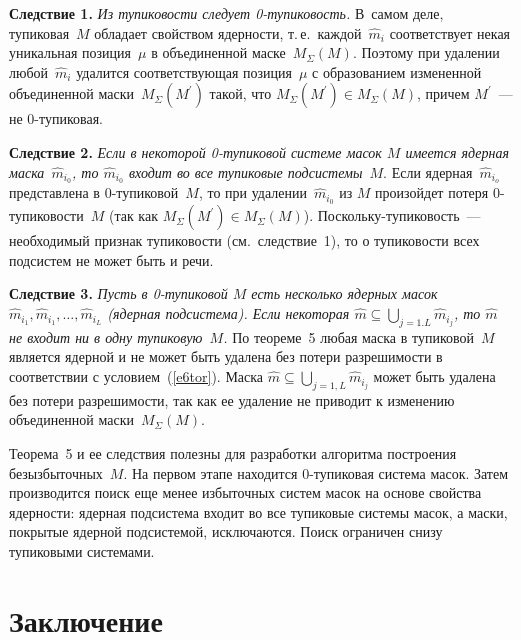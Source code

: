 \begin{multicols}{2}
\medskip

\noindent
\textbf{Следствие 1.} \textit{Из тупиковости следует 0-ту\-пи\-ковость.} 
В~самом деле, тупиковая~$M$ обладает свойством ядерности, т.\,е.\ 
каждой~$\hat{m}_i$ соответствует некая уникальная позиция~$\mu$ в 
объединенной маске~$M_\Sigma(M)$. Поэтому при удалении 
любой~$\hat{m}_i$ удалится соответствующая позиция~$\mu$ с образованием 
измененной объединенной маски~$M_\Sigma(M^\prime)$ такой, что 
$M_\Sigma(M^\prime)\in M_\Sigma(M)$, причем $M^\prime$~--- не 0-тупиковая.

\medskip

\noindent
\textbf{Следствие 2.} \textit{Если в некоторой 0-тупиковой сис\-те\-ме масок $M$ 
имеется ядерная маска~$\hat{m}_{i_0}$, то $\hat{m}_{i_0}$ входит во все 
тупиковые подсистемы}~$M$. Если ядерная~$\hat{m}_{i_o}$ представлена в 
0-тупиковой~$M$, то при удалении~$\hat{m}_{i_0}$ из $M$ произойдет потеря 
0-ту\-пи\-ко\-вости~$M$ (так как $M_\Sigma(M^\prime)\in M_\Sigma(M)$). 
Поскольку\linebreak 0-тупиковость~--- необходимый признак тупиковости (см.\ следствие~1), 
то о тупиковости всех подсистем не может быть и речи. 

\medskip

\noindent
\textbf{Следствие 3.} \textit{Пусть в 0-тупиковой $M$ есть несколько ядерных 
масок $\hat{m}_{i_1}, \hat{m}_{i_1}, \ldots , \hat{m}_{i_L}$ (ядерная 
подсистема). Если некоторая $\hat{m}\subseteq \bigcup\limits_{j=1.L} 
\hat{m}_{i_j}$, то $\hat{m}$ не входит ни в одну тупиковую~$M$.} По 
теореме~5 любая маска в тупиковой~$M$ является ядерной и не может быть 
удалена без потери разрешимости в соответствии с условием~(\ref{e6tor}). 
Маска $\hat{m}\subseteq \bigcup\limits_{j=1,L} \hat{m}_{i_j}$ может быть удалена 
без потери разрешимости, так как ее удаление не приводит к изменению 
объединенной маски~$M_\Sigma (M)$.

\medskip

    Теорема~5 и ее следствия полезны для разработки алгоритма построения 
безызбыточных~$M$. На первом этапе находится 0-тупиковая система масок. 
Затем производится поиск еще менее избыточных систем масок на основе 
свойства ядерности: ядерная подсистема входит во все тупиковые системы 
масок, а маски, покрытые ядерной подсистемой, исключаются. Поиск 
ограничен снизу тупиковыми системами. 

\section{Заключение}


\end{multicols}
